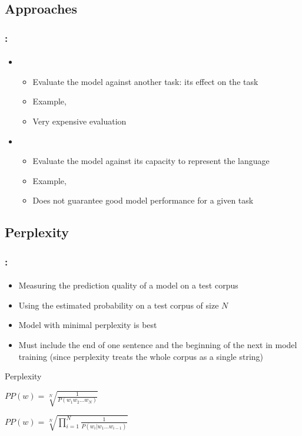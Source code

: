 \documentclass[xcolor=table]{beamer}
\begin{document}
\subsection{Approaches}

\begin{frame}
	\frametitle{\insertshortsubtitle: \insertsection}
	\framesubtitle{\insertsubsection}

	\begin{itemize}
		\item {}
		\begin{itemize}
			\item Evaluate the model against another task: its effect on the task
			\item Example, 
			\item Very expensive evaluation
		\end{itemize}
		\item {}
		\begin{itemize}
			\item Evaluate the model against its capacity to represent the language
			\item Example, 
			\item Does not guarantee good model performance for a given task
		\end{itemize}
	\end{itemize}

\end{frame}

\subsection{Perplexity}

\begin{frame}
	\frametitle{\insertshortsubtitle: \insertsection}
	\framesubtitle{\insertsubsection}

	\begin{itemize}
		\item Measuring the prediction quality of a model on a test corpus
		\item Using the estimated probability on a test corpus of size $N$
		\item Model with minimal perplexity is best
		\item Must include the end of one sentence and the beginning of the next in model training (since perplexity treats the whole corpus as a single string)
	\end{itemize}
	
	\begin{block}{Perplexity}
		\begin{center}
			$PP(w) = \sqrt[N]{\frac{1}{P(w_1 w_2 \ldots w_N)}}$
			
			$PP(w) = \sqrt[N]{\prod\limits_{i=1}^{N}\frac{1}{P(w_i | w_1 \ldots w_{i-1})}}$
		\end{center}
	\end{block}

\end{frame}
\end{document}
